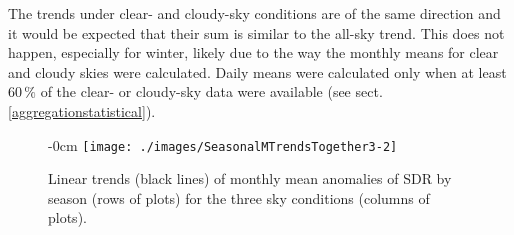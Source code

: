 \documentclass[applsci,article,submit,moreauthors,pdftex]{Definitions/mdpi}
\begin{document}
The trends under clear- and cloudy-sky conditions are of the same
direction and it would be expected that their sum is similar to the
all-sky trend. This does not happen, especially for winter, likely due
to the way the monthly means for clear and cloudy skies were calculated.
Daily means were calculated only when at least \(60\,\%\) of the clear-
or cloudy-sky data were available (see sect.
\ref{aggregationstatistical}).

\begin{figure}[h!]
    \begin{adjustwidth}{-\extralength}{0cm}
        {\centering 
            \texttt{[image: ./images/SeasonalMTrendsTogether3-2]}   %
        }
        \caption{Linear trends (black lines) of monthly mean anomalies of SDR by season (rows of plots) for the three sky conditions (columns of plots).}\label{fig:seasonalALL}
    \end{adjustwidth}
\end{figure}
\end{document}
